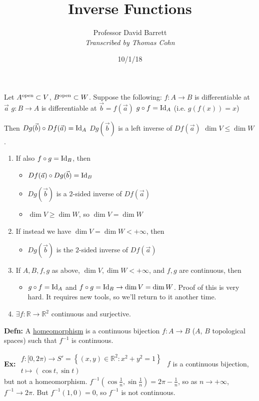 \documentclass[10pt,letterpaper]{article}
\author{Professor David Barrett\\ \small\textit{Transcribed by Thomas Cohn}}
\title{Inverse Functions}
\date{10/1/18} %
\newcommand{\n}{\hfill\break}
\newcommand{\defn}[1]{\par\noindent\settowidth{\hangindent}{\textbf{Defn: }}\textbf{Defn: }#1\n}
\newcommand{\ex}[1]{\par\noindent\settowidth{\hangindent}{\textbf{Ex: }}\textbf{Ex: }#1\n}
\newcommand{\ptxt}[1]{\textrm{\textnormal{#1}}}
\newcommand{\set}[1]{\left\{#1\right\}}
\newcommand{\reals}{\mathbb{R}}
\newcommand{\R}{\reals}
\newcommand{\inv}{^{-1}}
\newcommand{\of}{\circ}
\newcommand{\Id}{\textrm{\textnormal{Id}}}
\begin{document}
\maketitle
\setlength\RaggedRightParindent{\parindent}
\RaggedRight

\par\noindent Let $A^{\ptxt{open}}\subset{}V$, $B^{\ptxt{open}}\subset{}W$. Suppose the following:\n
$f:A\to{}B$ is differentiable at $\vec{a}$\n
$g:B\to{}A$ is differentiable at $\vec{b}=f(\vec{a})$\n
$g\of{}f=\Id_{A}$ (i.e. $g(f(x))=x$)\n

\par\noindent Then $Dg(\vec{b})\of{}Df(\vec{a})=\Id_{A}$\n
$Dg(\vec{b})$ is a left inverse of $Df(\vec{a})$\n
$\dim{}V\le\dim{}W$.\n

\begin{enumerate}
	\item If also $f\of{}g=\Id_{B}$, then
	\begin{itemize}
		\item $Df(\vec{a})\of{}Dg(\vec{b})=\Id_{B}$
		\item $Dg(\vec{b})$ is a $2$-sided inverse of $Df(\vec{a})$
		\item $\dim{}V\ge\dim{}W$, so $\dim{}V=\dim{}W$
	\end{itemize}
	\item If instead we have $\dim{}V=\dim{}W<+\infty$, then
	\begin{itemize}
		\item $Dg(\vec{b})$ is  the $2$-sided inverse of $Df(\vec{a})$
	\end{itemize}
	\item If $A,B,f,g$ as above, $\dim{}V,\dim{}W<+\infty$, and $f,g$ are continuous, then
	\begin{itemize}
		\item $g\of{}f=\Id_{A}$ and $f\of{}g=\Id_{B}\to\dim{}V=\dim{}W$. Proof of this is very hard. It requires new tools, so we'll return to it another time.
	\end{itemize}
	\item $\exists{}f:\R\to\R^{2}$ continuous and surjective.
\end{enumerate}

\defn{A \underline{homeomorphism} is a continuous bijection $f:A\to{}B$ ($A$, $B$ topological spaces) such that $f\inv$ is continuous.}

\ex{$\begin{array}{l}f:[0,2\pi)\to{}S'=\set{(x,y)\in\R^{2}:x^{2}+y^{2}=1}\\ t\mapsto(\cos{}t,\sin{}t)\end{array}$\n
$f$ is a continuous bijection, but not a homeomorphism.\n
$f\inv\left(\cos\frac{1}{n},\sin\frac{1}{n}\right)=2\pi-\frac{1}{n}$, so as $n\to+\infty$, $f\inv\to{}2\pi$. But $f\inv(1,0)=0$, so $f\inv$ is not continuous.}
\end{document}
